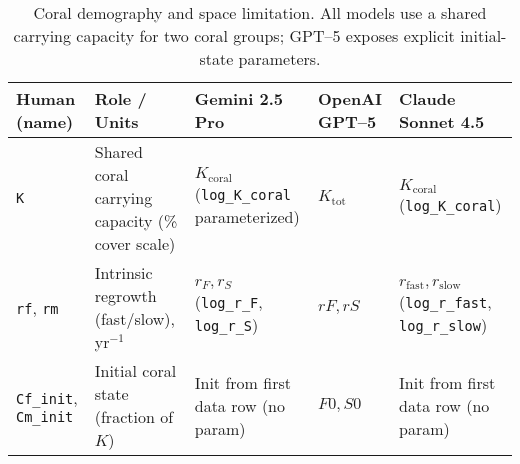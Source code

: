 \begin{landscape}
\begin{table}[htbp]
\centering
\footnotesize
\renewcommand{\arraystretch}{1.15}
\setlength{\tabcolsep}{3pt}
\begin{tabularx}{\linewidth}{@{}l l l l X@{}}
\toprule
\textbf{Human (name)} & \textbf{Role / Units} & \textbf{Gemini 2.5 Pro} & \textbf{OpenAI GPT--5} & \textbf{Claude Sonnet 4.5} \\
\midrule
\texttt{K} & Shared coral carrying capacity (\% cover scale) &
$K_{\text{coral}}$ (\texttt{log\_K\_coral} parameterized) &
$K_{\text{tot}}$ &
$K_{\text{coral}}$ (\texttt{log\_K\_coral}) \\
\texttt{rf}, \texttt{rm} & Intrinsic regrowth (fast/slow), yr$^{-1}$ &
$r_F,r_S$ (\texttt{log\_r\_F}, \texttt{log\_r\_S}) &
$rF,rS$ &
$r_{\text{fast}},r_{\text{slow}}$ (\texttt{log\_r\_fast}, \texttt{log\_r\_slow}) \\
\texttt{Cf\_init}, \texttt{Cm\_init} & Initial coral state (fraction of $K$) &
Init from first data row (no param) &
$F0,S0$ &
Init from first data row (no param) \\
\bottomrule
\end{tabularx}
\caption{Coral demography and space limitation. All models use a shared carrying capacity for two coral groups; GPT--5 exposes explicit initial-state parameters.}
\label{tab:params_coral}
\end{table}
\end{landscape}


